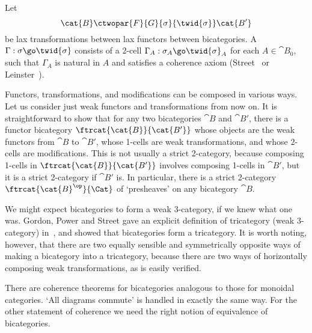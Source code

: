 \begin{defn}
Let 
\[
\cat{B}
\ctwopar{F}{G}{\sigma}{\twid{\sigma}}
\cat{B'}
\]
be lax transformations between lax functors between bicategories.  A
%
%
%
$\Gamma: \sigma \go \twid{\sigma}$ consists of a 2-cell $\Gamma_A: \sigma_A
\go \twid{\sigma}_A$ for each $A \in \cat{B}_0$, such that $\Gamma_A$ is
natural in $A$ and satisfies a coherence axiom (Street~\cite[p.~569]{StrCS}
or Leinster~\cite[1.3]{BB}).
\end{defn}

Functors, transformations, and modifications can be composed in various
ways.  Let us consider just weak functors and transformations from now on.
It is straightforward to show that for any two bicategories $\cat{B}$ and
$\cat{B'}$, there is a functor bicategory $\ftrcat{\cat{B}}{\cat{B'}}$%
% 
% 
whose objects are the weak functors from $\cat{B}$ to $\cat{B'}$, whose
1-cells are weak transformations, and whose 2-cells are modifications.
This is not usually a strict 2-category, because composing 1-cells in
$\ftrcat{\cat{B}}{\cat{B'}}$ involves composing 1-cells in $\cat{B'}$, but
it is a strict 2-category if $\cat{B'}$ is.  In particular, there is a
strict 2-category $\ftrcat{\cat{B}^\op}{\Cat}$ of `presheaves' on any
bicategory $\cat{B}$.

We might expect bicategories to form a weak 3-category, if we knew what one
was.  Gordon,%
%
%
Power and Street gave an explicit definition of tricategory%
%
%
(weak 3-category) in~\cite{GPS}, and showed that bicategories form a
tricategory.  It is worth noting, however, that there are two equally
sensible and symmetrically%
%
%
opposite ways of making a bicategory into a
tricategory, because there are two ways of horizontally composing weak
transformations, as is easily verified.  

%
% 
There are coherence theorems for bicategories analogous to those for
monoidal categories.  `All diagrams commute' is handled in exactly the same
way.  For the other statement of coherence we need the right notion of
equivalence of bicategories.  

